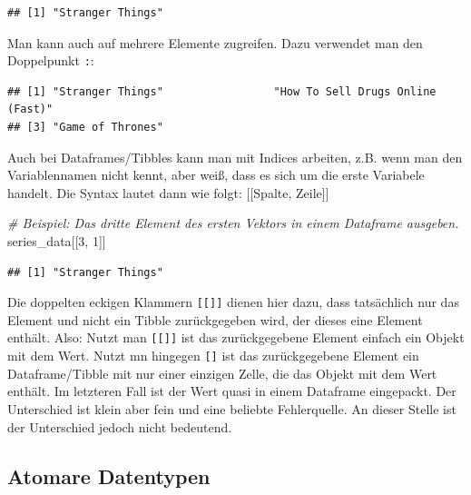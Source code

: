 \documentclass[
]{book}
\newenvironment{Shaded}{\begin{snugshade}}{\end{snugshade}}
\newcommand{\CommentTok}[1]{\textcolor[rgb]{0.56,0.35,0.01}{\textit{#1}}}
\newcommand{\DecValTok}[1]{\textcolor[rgb]{0.00,0.00,0.81}{#1}}
\newcommand{\NormalTok}[1]{#1}
\newcommand{\SpecialCharTok}[1]{\textcolor[rgb]{0.00,0.00,0.00}{#1}}
\begin{document}
\begin{verbatim}
## [1] "Stranger Things"
\end{verbatim}

Man kann auch auf mehrere Elemente zugreifen. Dazu verwendet man den Doppelpunkt \texttt{:}:

\begin{Shaded}
\end{Shaded}

\begin{verbatim}
## [1] "Stranger Things"                 "How To Sell Drugs Online (Fast)"
## [3] "Game of Thrones"
\end{verbatim}

Auch bei Dataframes/Tibbles kann man mit Indices arbeiten, z.B. wenn man den Variablennamen nicht kennt, aber weiß, dass es sich um die erste Variabele handelt. Die Syntax lautet dann wie folgt: {[}{[}Spalte, Zeile{]}{]}

\begin{Shaded}
\begin{Highlighting}[]
\CommentTok{\# Beispiel: Das dritte Element des ersten Vektors in einem Dataframe ausgeben.}
\NormalTok{series\_data[[}\DecValTok{3}\NormalTok{, }\DecValTok{1}\NormalTok{]]}
\end{Highlighting}
\end{Shaded}

\begin{verbatim}
## [1] "Stranger Things"
\end{verbatim}

Die doppelten eckigen Klammern \texttt{{[}{[}{]}{]}} dienen hier dazu, dass tatsächlich nur das Element und nicht ein Tibble zurückgegeben wird, der dieses eine Element enthält. Also: Nutzt man \texttt{{[}{[}{]}{]}} ist das zurückgegebene Element einfach ein Objekt mit dem Wert. Nutzt mn hingegen \texttt{{[}{]}} ist das zurückgegebene Element ein Dataframe/Tibble mit nur einer einzigen Zelle, die das Objekt mit dem Wert enthält. Im letzteren Fall ist der Wert quasi in einem Dataframe eingepackt. Der Unterschied ist klein aber fein und eine beliebte Fehlerquelle. An dieser Stelle ist der Unterschied jedoch nicht bedeutend.

\hypertarget{atomic_vector_types}{%
\subsection{Atomare Datentypen}\label{atomic_vector_types}}
\end{document}
